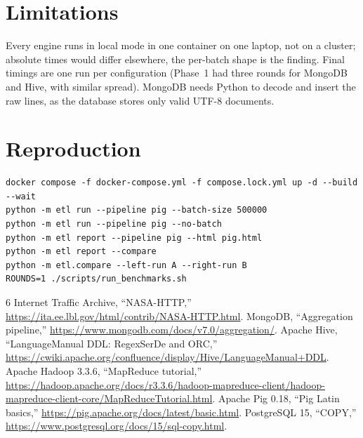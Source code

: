 \documentclass[conference]{IEEEtran}
\begin{document}
\section{Limitations}
Every engine runs in local mode in one container on one laptop, not on a cluster; absolute times
would differ elsewhere, the per-batch shape is the finding. Final timings are one run per
configuration (Phase~1 had three rounds for MongoDB and Hive, with similar spread). MongoDB needs
Python to decode and insert the raw lines, as the database stores only valid UTF-8 documents.

\section{Reproduction}
\begin{lstlisting}
docker compose -f docker-compose.yml -f compose.lock.yml up -d --build --wait
python -m etl run --pipeline pig --batch-size 500000
python -m etl run --pipeline pig --no-batch
python -m etl report --pipeline pig --html pig.html
python -m etl report --compare
python -m etl.compare --left-run A --right-run B
ROUNDS=1 ./scripts/run_benchmarks.sh
\end{lstlisting}

\begin{thebibliography}{6}
 Internet Traffic Archive, ``NASA-HTTP,'' \url{https://ita.ee.lbl.gov/html/contrib/NASA-HTTP.html}.
 MongoDB, ``Aggregation pipeline,'' \url{https://www.mongodb.com/docs/v7.0/aggregation/}.
 Apache Hive, ``LanguageManual DDL: RegexSerDe and ORC,'' \url{https://cwiki.apache.org/confluence/display/Hive/LanguageManual+DDL}.
 Apache Hadoop 3.3.6, ``MapReduce tutorial,'' \url{https://hadoop.apache.org/docs/r3.3.6/hadoop-mapreduce-client/hadoop-mapreduce-client-core/MapReduceTutorial.html}.
 Apache Pig 0.18, ``Pig Latin basics,'' \url{https://pig.apache.org/docs/latest/basic.html}.
 PostgreSQL 15, ``COPY,'' \url{https://www.postgresql.org/docs/15/sql-copy.html}.
\end{thebibliography}
\end{document}
